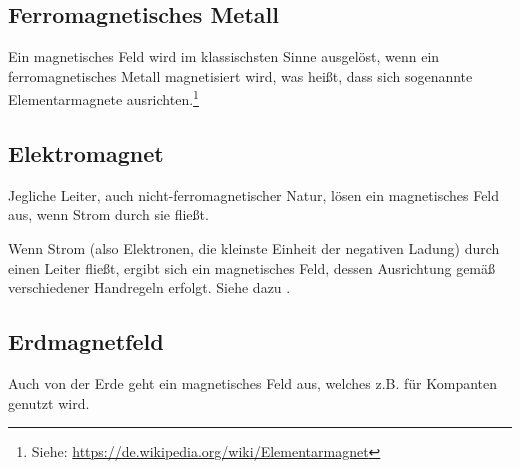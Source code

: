 




%
%	





\subsection{Ferromagnetisches Metall}

Ein magnetisches Feld wird im klassischsten Sinne ausgelöst, wenn ein ferromagnetisches Metall \glqq magnetisiert\grqq{} wird, was heißt, dass sich sogenannte Elementarmagnete ausrichten.\footnote{Siehe: \url{https://de.wikipedia.org/wiki/Elementarmagnet}}


\subsection{Elektromagnet}

Jegliche Leiter, auch nicht-ferromagnetischer Natur, lösen ein magnetisches Feld aus, wenn Strom durch sie fließt.

Wenn Strom (also Elektronen, die kleinste Einheit der negativen Ladung) durch einen Leiter fließt, ergibt sich ein magnetisches Feld, dessen Ausrichtung gemäß verschiedener Handregeln erfolgt. Siehe dazu .


\subsection{Erdmagnetfeld}

Auch von der Erde geht ein magnetisches Feld aus, welches z.B. für Kompanten genutzt wird.

